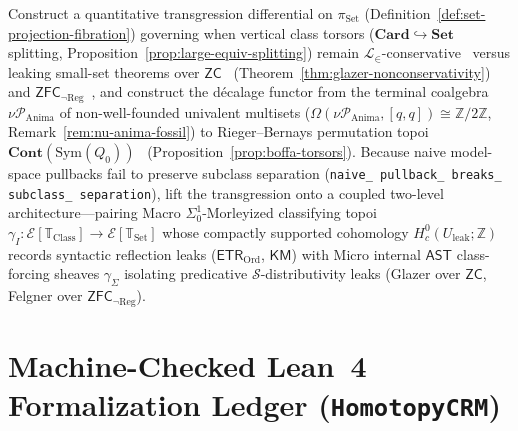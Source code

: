 \begin{problem}\label{prob:open-17}
Construct a quantitative transgression differential on $\pi_{\mathrm{Set}}$ (Definition~\ref{def:set-projection-fibration}) governing when vertical class torsors ($\mathbf{Card} \hookrightarrow \mathbf{Set}$ splitting, Proposition~\ref{prop:large-equiv-splitting}) remain $\mathcal{L}_\in$-conservative~\cite{Felgner71} versus leaking small-set theorems over $\mathsf{ZC}$~\cite{Glazer23} (Theorem~\ref{thm:glazer-nonconservativity}) and $\mathsf{ZFC}_{\neg\mathrm{Reg}}$~\cite{Felgner76}, and construct the d\'ecalage functor from the terminal coalgebra $\nu\mathcal{P}_{\mathrm{Anima}}$ of non-well-founded univalent multisets ($\Omega(\nu\mathcal{P}_{\mathrm{Anima}}, [q,q]) \cong \mathbb{Z}/2\mathbb{Z}$, Remark~\ref{rem:nu-anima-fossil}) to Rieger--Bernays permutation topoi $\mathbf{Cont}(\mathrm{Sym}(Q_0))$~\cite{Bernays54,Rieger57,Boffa69} (Proposition~\ref{prop:boffa-torsors}). Because naive model-space pullbacks fail to preserve subclass separation (\texttt{naive\_ pullback\_ breaks\_ subclass\_ separation}), lift the transgression onto a coupled two-level architecture---pairing Macro $\Sigma^1_0$-Morleyized classifying topoi $\gamma_I \colon \mathcal{E}[\mathbb{T}_{\mathrm{Class}}] \to \mathcal{E}[\mathbb{T}_{\mathrm{Set}}]$ whose compactly supported cohomology $H^0_c(U_{\mathrm{leak}}; \mathbb{Z})$ records syntactic reflection leaks ($\mathsf{ETR}_{\mathrm{Ord}}$, $\mathsf{KM}$) with Micro internal $\mathsf{AST}$ class-forcing sheaves $\gamma_\Sigma$ isolating predicative $\mathcal{S}$-distributivity leaks (Glazer over $\mathsf{ZC}$, Felgner over $\mathsf{ZFC}_{\neg\mathrm{Reg}}$).
\end{problem}

\section{Machine-Checked Lean~4 Formalization Ledger (\texttt{HomotopyCRM})}\label{subsec:lean4-verification-ledger}

